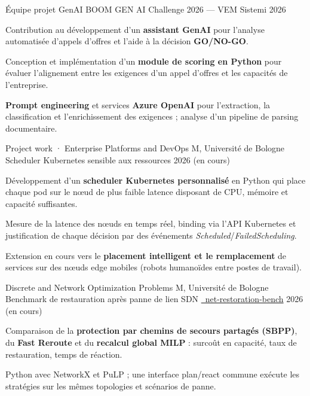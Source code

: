 \documentclass[11pt, a4paper]{../awesome-cv}
\begin{document}
\begin{cventries}
  \cventry
    {Équipe projet GenAI}
    {BOOM GEN AI Challenge 2026 — VEM Sistemi}
    {}
    {2026}
    {
      \begin{cvitems}
        \item {Contribution au développement d'un \textbf{assistant GenAI} pour l'analyse automatisée d'appels d'offres et l'aide à la décision \textbf{GO/NO-GO}.}
        \item {Conception et implémentation d'un \textbf{module de scoring en Python} pour évaluer l'alignement entre les exigences d'un appel d'offres et les capacités de l'entreprise.}
        \item {\textbf{Prompt engineering} et services \textbf{Azure OpenAI} pour l'extraction, la classification et l'enrichissement des exigences ; analyse d'un pipeline de parsing documentaire.}
      \end{cvitems}
    }

  \cventry
    {Project work · Enterprise Platforms and DevOps M, Université de Bologne}
    {Scheduler Kubernetes sensible aux ressources}
    {}
    {2026 (en cours)}
    {
      \begin{cvitems}
        \item {Développement d'un \textbf{scheduler Kubernetes personnalisé} en Python qui place chaque pod sur le nœud de plus faible latence disposant de CPU, mémoire et capacité suffisantes.}
        \item {Mesure de la latence des nœuds en temps réel, binding via l'API Kubernetes et justification de chaque décision par des événements \textit{Scheduled}/\textit{FailedScheduling}.}
        \item {Extension en cours vers le \textbf{placement intelligent et le remplacement} de services sur des nœuds edge mobiles (robots humanoïdes entre postes de travail).}
      \end{cvitems}
    }

  \cventry
    {Discrete and Network Optimization Problems M, Université de Bologne}
    {Benchmark de restauration après panne de lien SDN}
    {\href{https://github.com/frigori/net-restoration-bench}{\faGithub\ net-restoration-bench}}
    {2026 (en cours)}
    {
      \begin{cvitems}
        \item {Comparaison de la \textbf{protection par chemins de secours partagés (SBPP)}, du \textbf{Fast Reroute} et du \textbf{recalcul global MILP} : surcoût en capacité, taux de restauration, temps de réaction.}
        \item {Python avec NetworkX et PuLP ; une interface plan/react commune exécute les stratégies sur les mêmes topologies et scénarios de panne.}
      \end{cvitems}
    }


\end{cventries}
\end{document}
